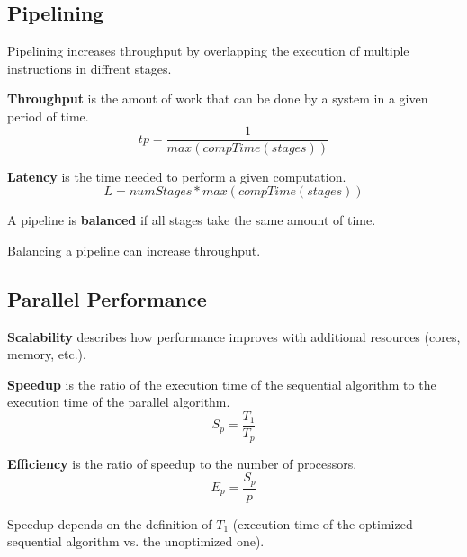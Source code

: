 \subsection{Pipelining}

Pipelining increases throughput by overlapping the execution of multiple instructions in diffrent stages.


\begin{definition}
\textbf{Throughput } 
is the amout of work that can be done by a system in a given period of time. 
$$tp = \frac{1}{max(compTime(stages))}$$
\end{definition}

\begin{definition}
\textbf{Latency } is the time needed to perform a given computation.
$$L = numStages * max(compTime(stages))$$
\end{definition}

\begin{definition}
A pipeline is \textbf{balanced } if all stages take the same amount of time.            
\end{definition}

\begin{important}
Balancing a pipeline can increase throughput.
\end{important}

\subsection{Parallel Performance}

\begin{definition}
\textbf{Scalability } describes how performance improves with additional resources (cores, memory, etc.).
\end{definition}

\begin{definition}
\textbf{Speedup } is the ratio of the execution time of the sequential algorithm to the execution time of the parallel algorithm.
$$S_p = \frac{T_1}{T_p}$$
\end{definition}

\begin{definition}
\textbf{Efficiency } is the ratio of speedup to the number of processors.
$$E_p = \frac{S_p}{p}$$
\end{definition}

\begin{remark}
Speedup depends on the definition of $T_1$ (execution time of the optimized sequential algorithm vs. the unoptimized one).
\end{remark}

